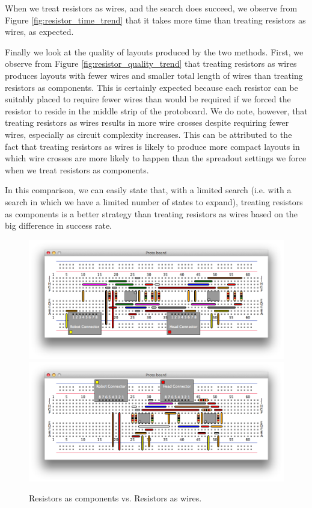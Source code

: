 When we treat resistors as wires, and the search does succeed, we observe from
Figure \ref{fig:resistor_time_trend} that it takes more time than treating
resistors as wires, as expected.

Finally we look at the quality of layouts produced by the two methods. First,
we observe from Figure \ref{fig:resistor_quality_trend} that treating resistors
as wires produces layouts with fewer wires and smaller total length of wires
than treating resistors as components. This is certainly expected because each
resistor can be suitably placed to require fewer wires than would be required
if we forced the resistor to reside in the middle strip of the protoboard. We
do note, however, that treating resistors as wires results in more wire crosses
despite requiring fewer wires, especially as circuit complexity increases. This
can be attributed to the fact that treating resistors as wires is likely to
produce more compact layouts in which wire crosses are more likely to happen
than the spreadout settings we force when we treat resistors as components.

In this comparison, we can easily state that, with a limited search (i.e. with
a search in which we have a limited number of states to expand), treating
resistors as components is a better strategy than treating resistors as wires
based on the big difference in success rate.

\begin{figure}
\begin{center}
\includegraphics[width=\textwidth]{Images/exemplar_per_pair_decreasing.png}
\includegraphics[width=\textwidth]{Images/exemplar_resistors_as_wires.png}
\caption{Resistors as components vs. Resistors as wires.}
\end{center}
\end{figure}

